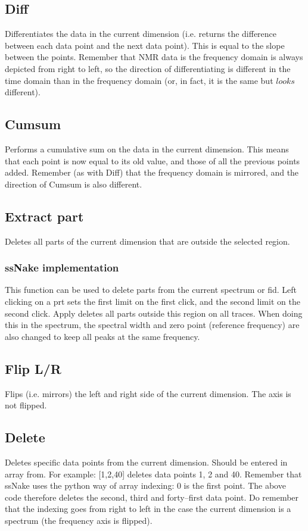 \documentclass[11pt,a4paper]{article}
\begin{document}
\subsection{Diff}
Differentiates the data in the current dimension (i.e. returns the difference between each data point and the next data point). This is equal to the slope between the points. Remember that NMR data is the frequency domain is always depicted from right to left, so the direction of differentiating is different in the time domain than in the frequency domain (or, in fact, it is the same but $looks$ different).

\subsection{Cumsum}
Performs a cumulative sum on the data in the current dimension. This means that each point is now equal to its old value, and those of all the previous points added. Remember (as with Diff) that the frequency domain is mirrored, and the direction of Cumsum is also different.


\subsection{Extract part}
Deletes all parts of the current dimension that are outside the selected region.


\subsubsection*{ssNake implementation}
This function can be used to delete parts from the current spectrum or fid. Left clicking on a prt sets the first limit on the first click, and the second limit on the second click. Apply deletes all parts outside this region on all traces. When doing this in the spectrum, the spectral width and zero point (reference frequency) are also changed to keep all peaks at the same frequency.

\subsection{Flip L/R}
Flips (i.e. mirrors) the left and right side of the current dimension. The axis is not flipped.

\subsection{Delete}
Deletes specific data points from the current dimension. Should be entered in array from. For example: [1,2,40] deletes data points 1, 2 and 40. Remember that ssNake uses the python way of array indexing: 0 is the first point. The above code therefore deletes the second, third and forty--first data point. Do remember that the indexing goes from right to left in the case the current dimension is a spectrum (the frequency axis is flipped).
\end{document}

